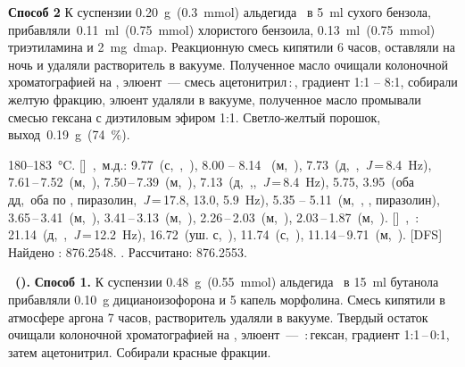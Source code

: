 \textbf{Способ 2} К суспензии \SI{0.20}{\gram}~(\SI{0.3}{\mmol}) альдегида~\textbf{} в \SI{5}{\milli\litre} сухого бензола, прибавляли~\SI{0.11}{\milli\litre}~(\SI{0.75}{\mmol}) хлористого бензоила, \SI{0.13}{\milli\litre}~(\SI{0.75}{\mmol}) триэтиламина и \SI{2}{\milli\gram}~\ac{dmap}.
Реакционную смесь кипятили 6 часов, оставляли на ночь и удаляли растворитель в вакууме.
Полученное масло очищали колоночной хроматографией на , элюент~--- смесь ацетонитрил\,:\,, градиент 1:1 -- 8:1, собирали желтую фракцию, элюент удаляли в вакууме, полученное масло промывали смесью гексана с диэтиловым эфиром 1:1. Светло-желтый порошок, выход~\SI{0.19}{\gram}~(\SI{74}{\percent}).
\begin{experimental}
     180--\SI{183}{\celsius}.
    []~\chemdelta,~м.д.: 9.77~(с,~,~), 8.00 -- 8.14 ~(м,~), 7.73~(д,~,~\textit{J}\,=\,8.4~\si{\hertz}), 7.61\,--\,7.52~(м,~), 7.50\,--\,7.39~(м,~), 7.13~(д,~,,~\textit{J}\,=\,8.4~\si{\hertz}), 5.75, 3.95~(оба дд,~оба по , пиразолин,~\textit{J}\,=\,17.8, 13.0, 5.9~\si{\hertz}), 5.35 -- 5.11~(м,~, , пиразолин), 3.65\,--\,3.41~(м,~), 3.41\,--\,3.13~(м,~), 2.26\,--\,2.03~(м,~), 2.03\,--\,1.87~(м,~).
    []~\chemdelta,~\si{\ppm}: 21.14~(д,~,~\textit{J}\,=\,12.2~\si{\hertz}), 16.72~(уш. с,~), 11.74~(с,~), 11.14\,--\,9.71~(м,~).
    [DFS] Найдено \ce{[M+]}: \num{876.2548}. . Рассчитано:  \num{876.2553}.
\end{experimental}

\textbf{~().} \textbf{Способ 1.} К суспензии \SI{0.48}{\gram}~(\SI{0.55}{\mmol}) альдегида~\textbf{} в \SI{15}{\milli\litre} бутанола прибавляли \SI{0.10}{\gram} дицианоизофорона и 5 капель морфолина. Смесь кипятили в атмосфере аргона 7 часов, растворитель удаляли в вакууме. Твердый остаток очищали колоночной хроматографией на , элюент~--- \,:\,гексан, градиент 1:1\,--\,0:1, затем ацетонитрил. Собирали красные фракции. 


